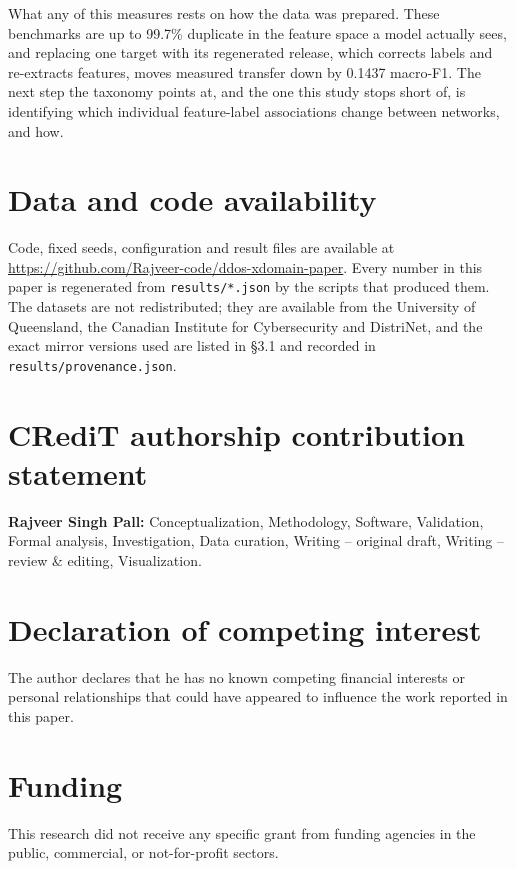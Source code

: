 \documentclass[preprint,12pt]{elsarticle}
\begin{document}
What any of this measures rests on how the data was prepared. These benchmarks are up to 99.7\% duplicate in the feature space a model actually sees, and replacing one target with its regenerated release, which corrects labels and re-extracts features, moves measured transfer down by 0.1437 macro-F1. The next step the taxonomy points at, and the one this study stops short of, is identifying which individual feature-label associations change between networks, and how.


\section*{Data and code availability}

Code, fixed seeds, configuration and result files are available at \url{https://github.com/Rajveer-code/ddos-xdomain-paper}. Every number in this paper is regenerated from \texttt{results/*.json} by the scripts that produced them. The datasets are not redistributed; they are available from the University of Queensland, the Canadian Institute for Cybersecurity and DistriNet, and the exact mirror versions used are listed in \S{}3.1 and recorded in \texttt{results/provenance.json}.


\section*{CRediT authorship contribution statement}
\textbf{Rajveer Singh Pall:} Conceptualization, Methodology, Software, Validation, Formal
analysis, Investigation, Data curation, Writing -- original draft, Writing -- review \&
editing, Visualization.

\section*{Declaration of competing interest}
The author declares that he has no known competing financial interests or personal
relationships that could have appeared to influence the work reported in this paper.

\section*{Funding}
This research did not receive any specific grant from funding agencies in the public,
commercial, or not-for-profit sectors.
\end{document}
